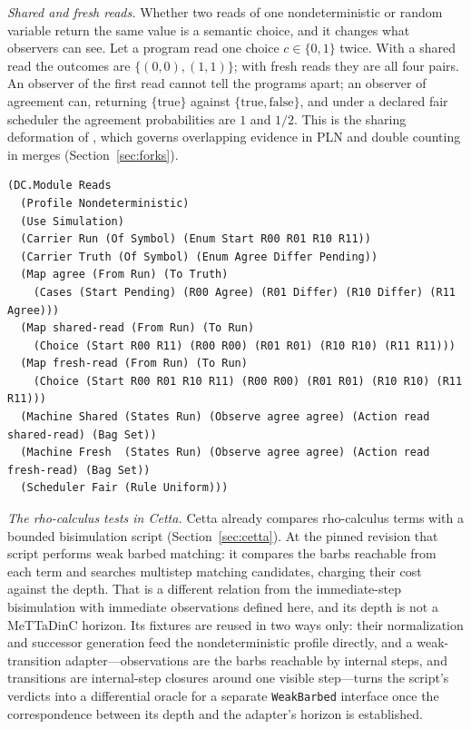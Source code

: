 \documentclass[11pt]{article}
\newcommand{\code}[1]{\texttt{#1}}
\theoremstyle{definition}
\theoremstyle{plain}
\begin{document}
\emph{Shared and fresh reads.} Whether two reads of one nondeterministic or random variable return
the same value is a semantic choice, and it changes what observers can see. Let a program read one
choice $c\in\{0,1\}$ twice. With a shared read the outcomes are $\{(0,0),(1,1)\}$; with fresh reads
they are all four pairs. An observer of the first read cannot tell the programs apart; an observer
of agreement can, returning $\{\mathrm{true}\}$ against $\{\mathrm{true},\mathrm{false}\}$, and under
a declared fair scheduler the agreement probabilities are $1$ and $1/2$. This is the sharing
deformation of \cite{aat}, which governs overlapping evidence in PLN \cite{plnoverlap} and double
counting in merges (Section~\ref{sec:forks}).
\begin{lstlisting}[basicstyle=\ttfamily\footnotesize,title={\scriptsize\ttfamily fixtures/reads.metta}]
(DC.Module Reads
  (Profile Nondeterministic)
  (Use Simulation)
  (Carrier Run (Of Symbol) (Enum Start R00 R01 R10 R11))
  (Carrier Truth (Of Symbol) (Enum Agree Differ Pending))
  (Map agree (From Run) (To Truth)
    (Cases (Start Pending) (R00 Agree) (R01 Differ) (R10 Differ) (R11 Agree)))
  (Map shared-read (From Run) (To Run)
    (Choice (Start R00 R11) (R00 R00) (R01 R01) (R10 R10) (R11 R11)))
  (Map fresh-read (From Run) (To Run)
    (Choice (Start R00 R01 R10 R11) (R00 R00) (R01 R01) (R10 R10) (R11 R11)))
  (Machine Shared (States Run) (Observe agree agree) (Action read shared-read) (Bag Set))
  (Machine Fresh  (States Run) (Observe agree agree) (Action read fresh-read) (Bag Set))
  (Scheduler Fair (Rule Uniform)))
\end{lstlisting}

\emph{The rho-calculus tests in Cetta.} Cetta already compares rho-calculus terms with a bounded
bisimulation script (Section~\ref{sec:cetta}). At the pinned revision that script performs weak
barbed matching: it compares the barbs reachable from each term and searches multistep matching
candidates, charging their cost against the depth. That is a different relation from the
immediate-step bisimulation with immediate observations defined here, and its depth is not a
MeTTaDinC horizon. Its fixtures are reused in two ways only: their normalization and successor
generation feed the nondeterministic profile directly, and a weak-transition adapter---observations
are the barbs reachable by internal steps, and transitions are internal-step closures around one
visible step---turns the script's verdicts into a differential oracle for a separate
\code{WeakBarbed} interface once the correspondence between its depth and the adapter's horizon is
established.
\end{document}
